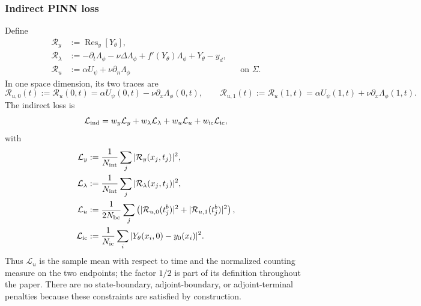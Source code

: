 \subsubsection{Indirect PINN loss}

Define
\begin{align}
\mathcal R_y&:=\operatorname{Res}_y[Y_\theta], \label{eq:res_y}\\
\mathcal R_\lambda&:=-\partial_t\Lambda_\phi-\nu\Delta\Lambda_\phi+f'(Y_\theta)\Lambda_\phi+Y_\theta-y_d, \label{eq:res_lambda}\\
\mathcal R_u&:=\alpha U_\psi+\nu\partial_n\Lambda_\phi &&\text{on }\Sigma. \label{eq:res_u}
\end{align}
In one space dimension, its two traces are
\begin{equation}
\mathcal R_{u,0}(t):=\mathcal R_u(0,t)=\alpha U_\psi(0,t)-\nu\partial_x\Lambda_\phi(0,t),\qquad
\mathcal R_{u,1}(t):=\mathcal R_u(1,t)=\alpha U_\psi(1,t)+\nu\partial_x\Lambda_\phi(1,t).
\label{eq:stationarity_traces}
\end{equation}
The indirect loss is
\begin{equation}
\label{eq:indirect_loss}
\mathcal L_{\rm ind}=w_y\mathcal L_y+w_\lambda\mathcal L_\lambda+w_u\mathcal L_u+w_{\rm ic}\mathcal L_{\rm ic},
\end{equation}
with
\begin{align}
\mathcal L_y&:=\frac1{N_{\rm int}}\sum_j|\mathcal R_y(x_j,t_j)|^2,\\
\mathcal L_\lambda&:=\frac1{N_{\rm int}}\sum_j|\mathcal R_\lambda(x_j,t_j)|^2,\\
\mathcal L_u&:=\frac1{2N_{\rm bc}}\sum_j\left(|\mathcal R_{u,0}(t_j^b)|^2+|\mathcal R_{u,1}(t_j^b)|^2\right), \label{eq:boundary_residual_loss}\\
\mathcal L_{\rm ic}&:=\frac1{N_{\rm ic}}\sum_i|Y_\theta(x_i,0)-y_0(x_i)|^2.
\end{align}
Thus $\mathcal L_u$ is the sample mean with respect to time and the normalized counting measure on the two endpoints; the factor $1/2$ is part of its definition throughout the paper.
There are no state-boundary, adjoint-boundary, or adjoint-terminal penalties because these constraints are satisfied by construction.
